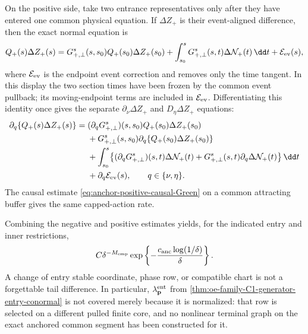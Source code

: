 \begin{lemma}
On the positive side, take two entrance representatives only after they
have entered one common physical equation.  If \(\Delta Z_+\) is their
event-aligned difference, then the exact normal equation is
\begin{equation}
 Q_+(s)\Delta Z_+(s)
 =G_{+,\perp}^s(s,s_0)Q_+(s_0)\Delta Z_+(s_0)
  +\int_{s_0}^sG_{+,\perp}^s(s,t)
       \Delta\mathcal N_+(t)\,\dd t
  +\mathcal E_{\rm ev}(s),                         \label{eq:anchor-positive-value-difference}
\end{equation}
where \(\mathcal E_{\rm ev}\) is the endpoint event correction and removes
only the time tangent.  In this display the two section times have been
frozen by the common event pullback; its moving-endpoint terms are included
in \(\mathcal E_{\rm ev}\).  Differentiating this identity once gives the
separate \(\partial_\nu\Delta Z_+\) and \(D_\eta\Delta Z_+\) equations:
\begin{align}
 \partial_q\{Q_+(s)\Delta Z_+(s)\}
={}&(\partial_qG_{+,\perp}^s)(s,s_0)
       Q_+(s_0)\Delta Z_+(s_0)\notag\\
 &+G_{+,\perp}^s(s,s_0)
       \partial_q\{Q_+(s_0)\Delta Z_+(s_0)\}\notag\\
 &+\int_{s_0}^s\bigl\{
       (\partial_qG_{+,\perp}^s)(s,t)
          \Delta\mathcal N_+(t)
       +G_{+,\perp}^s(s,t)
          \partial_q\Delta\mathcal N_+(t)\bigr\}\,\dd t\notag\\
 &+\partial_q\mathcal E_{\rm ev}(s),
 \qquad q\in\{\nu,\eta\}.                         \label{eq:anchor-positive-parameter-difference}
\end{align}
The causal estimate \cref{eq:anchor-positive-causal-Green} on a common
attracting buffer gives the same capped-action rate.

Combining the negative and positive estimates yields, for the indicated
entry and inner restrictions,
\begin{equation}
 C\delta^{-M_{\rm cmp}}
 \exp\left\{-\frac{c_{\rm anc}\log(1/\delta)}{\delta}\right\}.
                                                               \label{eq:anchor-annulus-capped-action}
\end{equation}
A change of entry stable coordinate, phase row, or compatible chart is not
a forgettable tail difference.  In particular,
\(\lambda_{\mathbf p}^{\rm ent}\) from
\cref{thm:oe-family-C1-generator-entry-conormal} is not covered merely
because it is normalized: that row is selected on a different pulled
finite core, and no nonlinear terminal graph on the exact anchored common
segment has been constructed for it.
\end{lemma}

